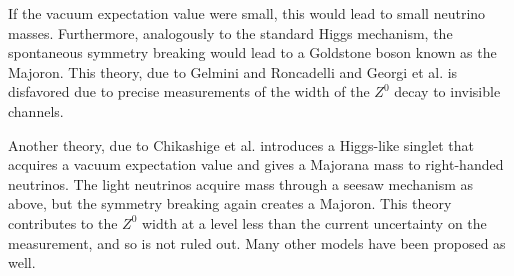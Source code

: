 \documentclass[herrin-thesis.tex]{subfiles}
\begin{document}
If the vacuum expectation value were small, this would lead to small neutrino masses. Furthermore, analogously to the standard Higgs mechanism, the spontaneous symmetry breaking would lead to a Goldstone boson known as the Majoron. This theory, due to Gelmini and Roncadelli\cite{Gelmini:1981uq} and Georgi et al.\cite{Georgi:1981kx} is disfavored due to precise measurements of the width of the \(Z^{0}\) decay to invisible channels.

Another theory, due to Chikashige et al.\cite{Chikashige:1981vn} introduces a Higgs-like singlet that acquires a vacuum expectation value and gives a Majorana mass to right-handed neutrinos. The light neutrinos acquire mass through a seesaw mechanism as above, but the symmetry breaking again creates a Majoron. This theory contributes to the \(Z^{0}\) width at a level less than the current uncertainty on the measurement, and so is not ruled out. Many other models have been proposed as well\cite{Bamert:1995fk}. 
\end{document}
